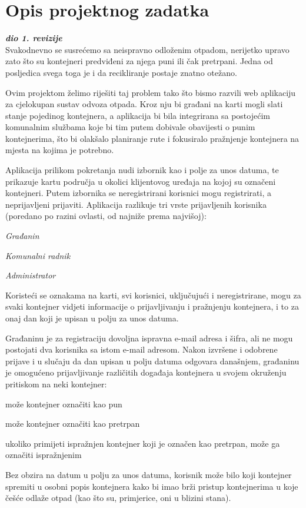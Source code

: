 \chapter{Opis projektnog zadatka}
		
		\textbf{\textit{dio 1. revizije}}\\
		
		Svakodnevno se susrećemo sa neispravno odloženim otpadom, nerijetko upravo zato što su kontejneri predviđeni za njega puni ili čak pretrpani. Jedna od posljedica svega toga je i da recikliranje postaje znatno otežano.
		
		Ovim projektom želimo riješiti taj problem tako što bismo razvili web aplikaciju za cjelokupan sustav odvoza otpada. Kroz nju bi građani na karti mogli slati stanje pojedinog kontejnera, a aplikacija bi bila integrirana sa postojećim komunalnim službama koje bi tim putem dobivale obavijesti o punim kontejnerima, što bi olakšalo planiranje rute i fokusiralo pražnjenje kontejnera na mjesta na kojima je potrebno.
		\linebreak
		
		Aplikacija prilikom pokretanja nudi izbornik kao i polje za unos datuma, te prikazuje kartu područja u okolici klijentovog uređaja na kojoj su označeni kontejneri. Putem izbornika se neregistrirani korisnici mogu registrirati, a neprijavljeni prijaviti. Aplikacija razlikuje tri vrste prijavljenih korisnika (poredano po razini ovlasti, od najniže prema najvišoj):
		\begin{packed_item}
			\item \textit{Građanin}
			\item \textit{Komunalni radnik}
			\item \textit{Administrator}
		\end{packed_item}
	
		Koristeći se oznakama na karti, svi korisnici, uključujući i neregistrirane, mogu za svaki kontejner vidjeti informacije o prijavljivanju i pražnjenju kontejnera, i to za onaj dan koji je upisan u polju za unos datuma.
		\linebreak
		
		Građaninu je za registraciju dovoljna ispravna e-mail adresa i šifra, ali ne mogu postojati dva korisnika sa istom e-mail adresom.
		Nakon izvršene i odobrene prijave i u slučaju da dan upisan u polju datuma odgovara današnjem, građaninu je omogućeno prijavljivanje različitih događaja kontejnera u svojem okruženju pritiskom na neki kontejner: 
		\begin{packed_item}
			\item može kontejner označiti kao pun
			\item može kontejner označiti kao pretrpan
			\item ukoliko primijeti ispražnjen kontejner koji je označen kao pretrpan, može ga označiti ispražnjenim
		\end{packed_item}
		Bez obzira na datum u polju za unos datuma, korisnik može bilo koji kontejner spremiti u osobni popis kontejnera kako bi imao brži pristup kontejnerima u koje češće odlaže otpad (kao što su, primjerice, oni u blizini stana).
		\linebreak
		
